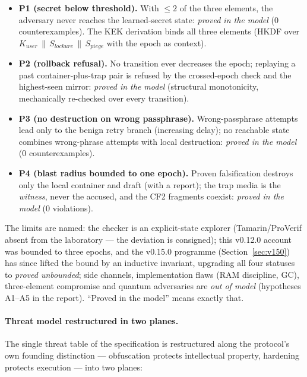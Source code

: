 \documentclass[11pt,a4paper]{article}
\begin{document}
\begin{itemize}
\item \textbf{P1 (secret below threshold).} With $\le 2$ of the three
elements, the adversary never reaches the learned-secret state:
\emph{proved in the model} (0 counterexamples). The KEK derivation
binds all three elements (HKDF over $K_{user}\,\|\,S_{lockure}\,\|\,
S_{piege}$ with the epoch as context).
\item \textbf{P2 (rollback refusal).} No transition ever decreases the
epoch; replaying a past container-plus-trap pair is refused by the
crossed-epoch check and the highest-seen mirror: \emph{proved in the
model} (structural monotonicity, mechanically re-checked over every
transition).
\item \textbf{P3 (no destruction on wrong passphrase).} Wrong-passphrase
attempts lead only to the benign retry branch (increasing delay); no
reachable state combines wrong-phrase attempts with local destruction:
\emph{proved in the model} (0 counterexamples).
\item \textbf{P4 (blast radius bounded to one epoch).} Proven
falsification destroys only the local container and draft (with a
report); the trap media is the \emph{witness}, never the accused, and
the CF2 fragments coexist: \emph{proved in the model} (0 violations).
\end{itemize}

The limits are named: the checker is an explicit-state explorer
(Tamarin/ProVerif absent from the laboratory --- the deviation is
consigned); this v0.12.0 account was bounded to three epochs, and
the v0.15.0 programme (Section~\ref{sec:v150}) has since lifted the
bound by an inductive invariant, upgrading all four statuses to
\emph{proved unbounded}; side channels, implementation flaws (RAM
discipline, GC),
three-element compromise and quantum adversaries are \emph{out of
model} (hypotheses A1--A5 in the report). ``Proved in the model'' means
exactly that.

\paragraph{Threat model restructured in two planes.} The single threat
table of the specification is restructured along the protocol's own
founding distinction --- obfuscation protects intellectual property,
hardening protects execution --- into two planes:
\end{document}
